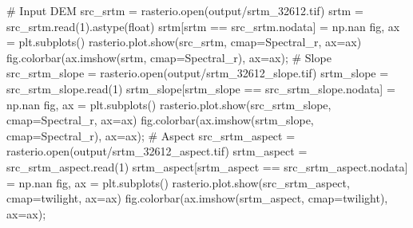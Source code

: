 \documentclass[
  letterpaper,
]{krantz}
\newenvironment{Shaded}{\begin{snugshade}}{\end{snugshade}}
\newcommand{\BuiltInTok}[1]{\textcolor[rgb]{0.00,0.23,0.31}{#1}}
\newcommand{\CommentTok}[1]{\textcolor[rgb]{0.37,0.37,0.37}{#1}}
\newcommand{\DecValTok}[1]{\textcolor[rgb]{0.68,0.00,0.00}{#1}}
\newcommand{\NormalTok}[1]{\textcolor[rgb]{0.00,0.23,0.31}{#1}}
\newcommand{\OperatorTok}[1]{\textcolor[rgb]{0.37,0.37,0.37}{#1}}
\newcommand{\StringTok}[1]{\textcolor[rgb]{0.13,0.47,0.30}{#1}}
\begin{document}
\begin{Shaded}
\begin{Highlighting}[]
\CommentTok{\# Input DEM}
\NormalTok{src\_srtm }\OperatorTok{=}\NormalTok{ rasterio.}\BuiltInTok{open}\NormalTok{(}\StringTok{\textquotesingle{}output/srtm\_32612.tif\textquotesingle{}}\NormalTok{)}
\NormalTok{srtm }\OperatorTok{=}\NormalTok{ src\_srtm.read(}\DecValTok{1}\NormalTok{).astype(}\BuiltInTok{float}\NormalTok{)}
\NormalTok{srtm[srtm }\OperatorTok{==}\NormalTok{ src\_srtm.nodata] }\OperatorTok{=}\NormalTok{ np.nan}
\NormalTok{fig, ax }\OperatorTok{=}\NormalTok{ plt.subplots()}
\NormalTok{rasterio.plot.show(src\_srtm, cmap}\OperatorTok{=}\StringTok{\textquotesingle{}Spectral\_r\textquotesingle{}}\NormalTok{, ax}\OperatorTok{=}\NormalTok{ax)}
\NormalTok{fig.colorbar(ax.imshow(srtm, cmap}\OperatorTok{=}\StringTok{\textquotesingle{}Spectral\_r\textquotesingle{}}\NormalTok{), ax}\OperatorTok{=}\NormalTok{ax)}\OperatorTok{;}
\CommentTok{\# Slope}
\NormalTok{src\_srtm\_slope }\OperatorTok{=}\NormalTok{ rasterio.}\BuiltInTok{open}\NormalTok{(}\StringTok{\textquotesingle{}output/srtm\_32612\_slope.tif\textquotesingle{}}\NormalTok{)}
\NormalTok{srtm\_slope }\OperatorTok{=}\NormalTok{ src\_srtm\_slope.read(}\DecValTok{1}\NormalTok{)}
\NormalTok{srtm\_slope[srtm\_slope }\OperatorTok{==}\NormalTok{ src\_srtm\_slope.nodata] }\OperatorTok{=}\NormalTok{ np.nan}
\NormalTok{fig, ax }\OperatorTok{=}\NormalTok{ plt.subplots()}
\NormalTok{rasterio.plot.show(src\_srtm\_slope, cmap}\OperatorTok{=}\StringTok{\textquotesingle{}Spectral\_r\textquotesingle{}}\NormalTok{, ax}\OperatorTok{=}\NormalTok{ax)}
\NormalTok{fig.colorbar(ax.imshow(srtm\_slope, cmap}\OperatorTok{=}\StringTok{\textquotesingle{}Spectral\_r\textquotesingle{}}\NormalTok{), ax}\OperatorTok{=}\NormalTok{ax)}\OperatorTok{;}
\CommentTok{\# Aspect}
\NormalTok{src\_srtm\_aspect }\OperatorTok{=}\NormalTok{ rasterio.}\BuiltInTok{open}\NormalTok{(}\StringTok{\textquotesingle{}output/srtm\_32612\_aspect.tif\textquotesingle{}}\NormalTok{)}
\NormalTok{srtm\_aspect }\OperatorTok{=}\NormalTok{ src\_srtm\_aspect.read(}\DecValTok{1}\NormalTok{)}
\NormalTok{srtm\_aspect[srtm\_aspect }\OperatorTok{==}\NormalTok{ src\_srtm\_aspect.nodata] }\OperatorTok{=}\NormalTok{ np.nan}
\NormalTok{fig, ax }\OperatorTok{=}\NormalTok{ plt.subplots()}
\NormalTok{rasterio.plot.show(src\_srtm\_aspect, cmap}\OperatorTok{=}\StringTok{\textquotesingle{}twilight\textquotesingle{}}\NormalTok{, ax}\OperatorTok{=}\NormalTok{ax)}
\NormalTok{fig.colorbar(ax.imshow(srtm\_aspect, cmap}\OperatorTok{=}\StringTok{\textquotesingle{}twilight\textquotesingle{}}\NormalTok{), ax}\OperatorTok{=}\NormalTok{ax)}\OperatorTok{;}
\end{Highlighting}
\end{Shaded}
\end{document}
